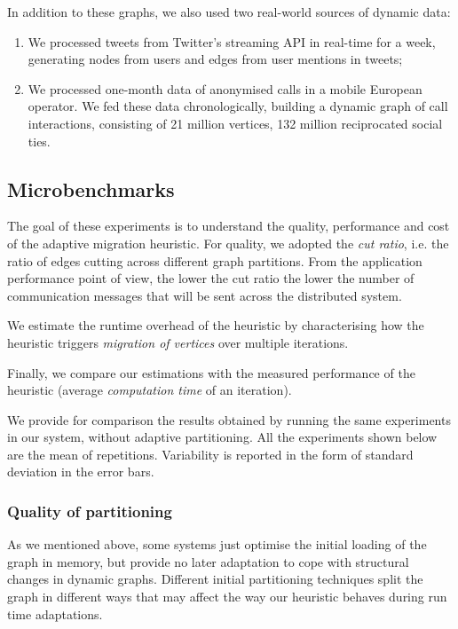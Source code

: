 \documentclass{sig-alternate-10pt}
\begin{document}
In addition to these graphs, we also used two real-world sources of dynamic data: 

\begin{enumerate}
\item We processed tweets from Twitter's streaming API  in real-time for a week, generating nodes from users and edges from user mentions in tweets; 
\item We processed one-month data of anonymised calls in a mobile European operator. We fed these data chronologically, building a dynamic graph of call interactions, consisting of 21 million vertices, 132 million reciprocated social ties. 

\end{enumerate}



\subsection{Microbenchmarks}
\label{sec:ubenchmark}

The goal of these experiments is to understand the quality, performance and cost of the adaptive migration heuristic. For quality, we adopted the \emph{cut ratio}, i.e. the ratio of edges cutting across different graph partitions. From the application performance point of view, the lower the cut ratio the lower the number of communication messages that will be sent across the distributed system.

We estimate the runtime overhead of the heuristic  by characterising how the heuristic triggers \emph{migration of vertices} over multiple iterations. 

Finally, we compare our estimations with the measured performance of the heuristic (average \emph{computation time} of an iteration). 

We provide for comparison the results obtained by running the same experiments in our system, without adaptive partitioning. All the experiments shown below are the mean of  repetitions. Variability is reported in the form of standard deviation in the error bars. \newline
 


\subsubsection{Quality of partitioning}

As we mentioned above, some systems just optimise the initial loading of the graph in memory, but provide no later adaptation to cope with structural changes in dynamic graphs. Different initial partitioning techniques split the graph in different ways that may affect the way our heuristic behaves during run time adaptations. 
\end{document}
